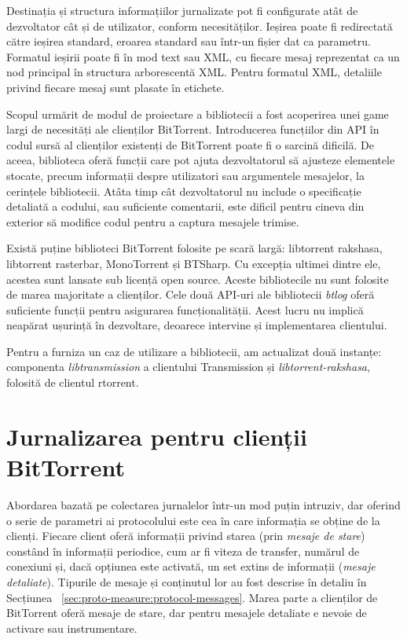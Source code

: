 Destinația și structura informațiilor jurnalizate pot fi configurate
atât de dezvoltator cât și de utilizator, conform necesităților. Ieșirea poate
fi redirectată către ieșirea standard, eroarea standard sau într-un fișier
dat ca parametru. Formatul ieșirii poate fi în mod text sau XML, cu fiecare
mesaj reprezentat ca un nod principal în structura arborescentă XML. Pentru
formatul XML, detaliile privind fiecare mesaj sunt plasate în etichete.

Scopul urmărit de modul de proiectare a bibliotecii a fost acoperirea unei
game largi de necesități ale clienților BitTorrent. Introducerea funcțiilor
din API în codul sursă al clienților existenți de BitTorrent poate fi o
sarcină dificilă. De aceea, biblioteca oferă funcții care pot ajuta
dezvoltatorul să ajusteze elementele stocate, precum informații despre
utilizatori sau argumentele mesajelor, la cerințele bibliotecii. Atâta timp cât
dezvoltatorul nu include o specificație detaliată a codului, sau suficiente
comentarii, este dificil pentru cineva din exterior să modifice codul pentru
a captura mesajele trimise.

Există puține biblioteci BitTorrent folosite pe scară largă:
libtorrent rakshasa, libtorrent rasterbar, MonoTorrent și BTSharp.
Cu excepția ultimei dintre ele, acestea sunt lansate sub licență open source.
Aceste bibliotecile nu sunt folosite de marea majoritate a clienților. Cele două
API-uri ale bibliotecii \textit{btlog} oferă suficiente funcții pentru
asigurarea funcționalității. Acest lucru nu implică neapărat ușurință în
dezvoltare, deoarece intervine și implementarea clientului.

Pentru a furniza un caz de utilizare a bibliotecii, am actualizat două
instanțe: componenta \textit{libtransmission} a clientului Transmission
și \textit{libtorrent-rakshasa}, folosită de clientul rtorrent.

\section{Jurnalizarea pentru clienții BitTorrent}
\label{sec:proto-measure:log-collect}

Abordarea bazată pe colectarea jurnalelor într-un mod puțin intruziv, dar
oferind o serie de parametri ai protocolului este cea în care informația se
obține de la clienți. Fiecare client oferă informații privind starea
(prin \textit{mesaje de stare}) constând în informații periodice, cum ar
fi viteza de transfer, numărul de conexiuni și, dacă opțiunea este activată,
un set extins de informații (\textit{mesaje detaliate}). Tipurile de mesaje și
conținutul lor au fost descrise în detaliu în Secțiunea ~\ref{sec:proto-measure:protocol-messages}. Marea parte a clienților de BitTorrent oferă mesaje de
stare, dar pentru mesajele detaliate e nevoie de activare sau instrumentare.

